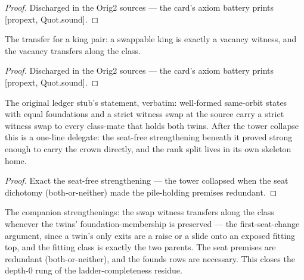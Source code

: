 \begin{proof}
\leanok
Discharged in the Orig2 sources --- the card's axiom battery prints [propext, Quot.sound].
\end{proof}

\begin{theorem}\label{thm:king}
\leanok
{}
The transfer for a king pair: a swappable king is exactly a
vacancy witness, and the vacancy transfers along the class.
\end{theorem}

\begin{proof}
\leanok
Discharged in the Orig2 sources --- the card's axiom battery prints [propext, Quot.sound].
\end{proof}

\begin{theorem}\label{thm:transferFull}
\leanok
{}
The original ledger stub's statement, verbatim: well-formed
same-orbit states with equal foundations and a strict witness
swap at the source carry a strict witness swap to every class-mate
that holds both twins.  After the tower collapse this is a
one-line delegate: the seat-free strengthening beneath it proved
strong enough to carry the crown directly, and the rank split
lives in its own skeleton home.
\end{theorem}

\begin{proof}
\leanok
{}
Exact the seat-free strengthening --- the tower collapsed when
the seat dichotomy (both-or-neither) made the pile-holding
premises redundant.
\end{proof}

\begin{theorem}\label{thm:twinMembership}
\leanok
{}
The companion strengthenings: the swap witness transfers along
the class whenever the twins' foundation-membership is preserved
--- the first-seat-change argument, since a twin's only exits
are a raise or a slide onto an exposed fitting top, and the
fitting class is exactly the two parents.  The seat premises
are redundant (both-or-neither), and the founds rows are
necessary.  This closes the depth-0 rung of the
ladder-completeness residue.
\end{theorem}

